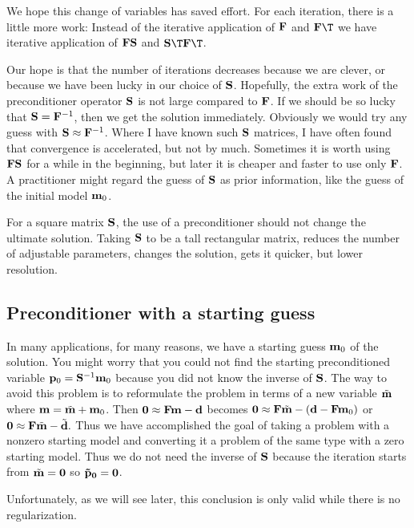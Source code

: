 \par
We hope this change of variables has saved effort.
For each iteration, there is a little more work:
Instead of the iterative application of
                                                $\bold F$ and $\bold F\T$
we have iterative application of
                                        $\bold F\bold S$ and $\bold S\T\bold F\T$.

Our hope is that the number of iterations decreases because we are clever,
or because we have been lucky in our choice of $\bold S$.
Hopefully,
the extra work of the preconditioner operator $\bold S$
is not large compared to $\bold F$.
If we should be so lucky that
$\bold S= \bold F^{-1}$,
then we get the solution immediately.
Obviously we would try any guess with
$\bold S\approx \bold F^{-1}$.
Where I have known such $\bold S$ matrices,
I have often found that convergence is accelerated,
but not by much.
Sometimes it is worth using $\bold F\bold S$ for a while in the beginning,
but later it is cheaper and faster to use only $\bold F$.
A practitioner might regard the guess of $\bold S$
as prior information,
like the guess of the initial model $\bold m_0$.

\par
For a square matrix $\bold S$,
the use of a preconditioner should not change the ultimate solution.
Taking $\bold S$ to be a tall rectangular matrix,
reduces the number of adjustable parameters,
changes the solution,
gets it quicker, but lower resolution.

\subsection{Preconditioner with a starting guess}

In many applications, for many reasons,
we have a starting guess $\bold m_0$ of the solution.
You might worry that
you could not find the starting preconditioned variable 
$\bold p_0= \bold S^{-1}\bold m_0$
because you did not know the inverse of $\bold S$.
The way to avoid this problem is to
reformulate the problem
in terms of a new variable $\tilde {\bold m}$
where
$ \bold m = \tilde {\bold m} + \bold m_0$.
Then 
$\bold 0\approx \bold F \bold m - \bold d$
becomes
$\bold 0\approx \bold F \tilde {\bold m} - (\bold d - \bold F \bold m_0)$
or
$\bold 0\approx \bold F \tilde {\bold m} - \tilde {\bold d}.$
Thus we have accomplished the goal of taking
a problem with a nonzero starting model
and converting it a problem of the same type
with a zero starting model.
Thus we do not need the inverse of $\bold S$
because the iteration starts from $\tilde {\bold m}=\bold 0$
so $\bold {\tilde p_0} = \bold 0$.
\par
Unfortunately, as we will see later,
this conclusion is only valid while there is no regularization.

